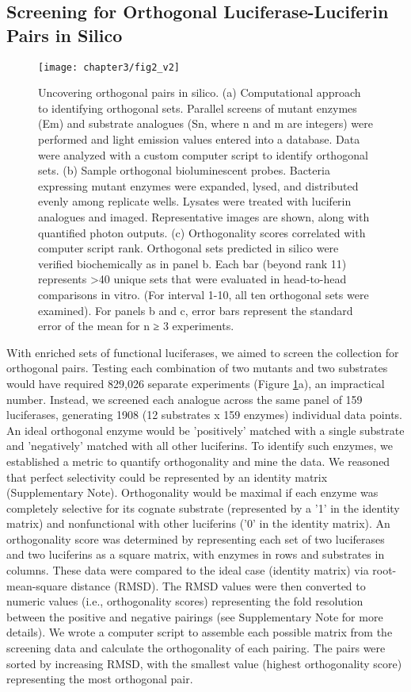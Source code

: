 \subsection*{Screening for Orthogonal Luciferase-Luciferin Pairs in Silico}
\begin{figure}[htbp]
\texttt{[image: chapter3/fig2\_v2]}
\centering
\caption[Uncovering orthogonal pairs in silico]{Uncovering orthogonal pairs in silico. (a) Computational approach to identifying orthogonal sets. Parallel screens of mutant enzymes (Em) and substrate analogues (Sn, where n and m are integers) were performed and light emission values entered into a database. Data were analyzed with a custom computer script to identify orthogonal sets. (b) Sample orthogonal bioluminescent probes. Bacteria expressing mutant enzymes were expanded, lysed, and distributed evenly among replicate wells. Lysates were treated with luciferin analogues and imaged. Representative images are shown, along with quantified photon outputs. (c) Orthogonality scores correlated with computer script rank. Orthogonal sets predicted in silico were verified biochemically as in panel b. Each bar (beyond rank 11) represents >40 unique sets that were evaluated in head-to-head comparisons in vitro. (For interval 1-10, all ten orthogonal sets were examined). For panels b and c, error bars represent the standard error of the mean for n ≥ 3 experiments.}
  \label{fig:inSilico}
\end{figure}
With enriched sets of functional luciferases, we aimed to screen the collection for orthogonal pairs. Testing each combination of two mutants and two substrates would have required 829,026 separate experiments (Figure \ref{fig:inSilico}a), an impractical number. Instead, we screened each analogue across the same panel of 159 luciferases, generating 1908 (12 substrates x 159 enzymes) individual data points.
An ideal orthogonal enzyme would be 'positively' matched with a single substrate and 'negatively' matched with all other luciferins. To identify such enzymes, we established a metric to quantify orthogonality and mine the data. We reasoned that perfect selectivity could be represented by an identity matrix
(Supplementary Note). Orthogonality would be maximal if each enzyme was completely selective for its cognate substrate (represented by a '1' in the identity matrix) and nonfunctional with other luciferins ('0' in the identity matrix). An orthogonality score was determined by representing each set of two luciferases and two luciferins as a square matrix, with enzymes in rows and substrates in columns. These data were compared to the ideal case (identity matrix) via root-mean-square distance (RMSD). The RMSD values were then converted to numeric values (i.e., orthogonality scores) representing the fold resolution between the positive and negative pairings (see Supplementary Note for more details). We wrote a computer script to assemble each possible matrix from the screening data and calculate the orthogonality of each pairing. The pairs were sorted by increasing RMSD, with the smallest value (highest orthogonality score) representing the most orthogonal pair.
